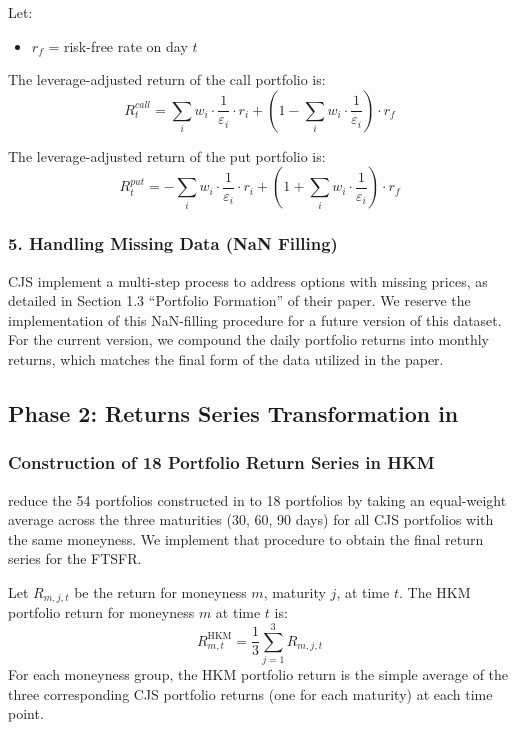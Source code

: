 \documentclass[11pt]{article}
\begin{document}
Let:
\begin{itemize}
  \item $r_{f}$ = risk-free rate on day $t$
\end{itemize}

The leverage-adjusted return of the call portfolio is:
\[
R_t^{call} = \sum_{i} w_{i} \cdot \frac{1}{\varepsilon_{i}} \cdot r_{i} + \left(1 - \sum_{i} w_{i} \cdot \frac{1}{\varepsilon_{i}} \right) \cdot r_f
\]

The leverage-adjusted return of the put portfolio is:
\[
R_t^{put} = -\sum_{i} w_{i} \cdot \frac{1}{\varepsilon_{i}} \cdot r_{i} + \left(1 + \sum_{i} w_{i} \cdot \frac{1}{\varepsilon_{i}} \right) \cdot r_f
\]



\subsubsection{5. Handling Missing Data (NaN Filling)}

CJS implement a multi-step process to address options with missing prices, as detailed in Section 1.3 ``Portfolio Formation'' of their paper. We reserve the implementation of this NaN-filling procedure for a future version of this dataset. For the current version, we compound the daily portfolio returns into monthly returns, which matches the final form of the data utilized in the paper.


\subsection{Phase 2: Returns Series Transformation in \citet{He2017}}
\subsubsection{Construction of 18 Portfolio Return Series in HKM}

\citet{He2017} reduce the 54 portfolios constructed in \citet{Constantinides2013} to 18 portfolios by taking an equal-weight average across the three maturities (30, 60, 90 days) for all CJS portfolios with the same moneyness. We implement that procedure to obtain the final return series for the FTSFR.

Let \( R_{m,j,t} \) be the return for moneyness \( m \), maturity \( j \), at time \( t \).
The HKM portfolio return for moneyness \( m \) at time \( t \) is:
\[
R_{m,t}^{\mathrm{HKM}} = \frac{1}{3} \sum_{j=1}^{3} R_{m,j,t}
\]
For each moneyness group, the HKM portfolio return is the simple average of the three corresponding CJS portfolio returns (one for each maturity) at each time point.
\end{document}
